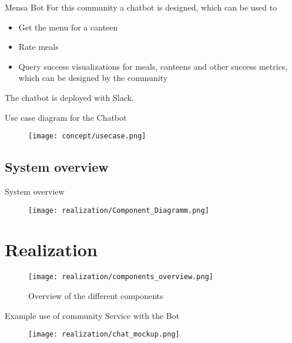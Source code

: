 \begin{frame}{Mensa Bot}
  For this community a chatbot is designed, which can be used to
  \begin{itemize}
    \item Get the menu for a canteen
    \item Rate meals
    \item Query success visualizations for meals, canteens and other success metrics, which can be designed by the community
  \end{itemize}
  The chatbot is deployed with Slack.
\end{frame}

\begin{frame}{Use case diagram for the Chatbot}
  \begin{figure}
    \centering
    \texttt{[image: concept/usecase.png]}

  \end{figure}
\end{frame}

\subsection{System overview}

\begin{frame}{System overview}
  \begin{figure}
    \centering
    \texttt{[image: realization/Component\_Diagramm.png]}

    \label{fig:sytsemOverview}
  \end{figure}
\end{frame}

\section{Realization}

\begin{frame}
  \begin{figure}
    \centering
    \texttt{[image: realization/components\_overview.png]}
    \caption{Overview of the different components}
    \label{fig:componentsOverview}
  \end{figure}
\end{frame}

\begin{frame}{Example use of community Service with the Bot}
  \begin{figure}
    \centering
    \texttt{[image: realization/chat\_mockup.png]}

  \end{figure}
\end{frame}

